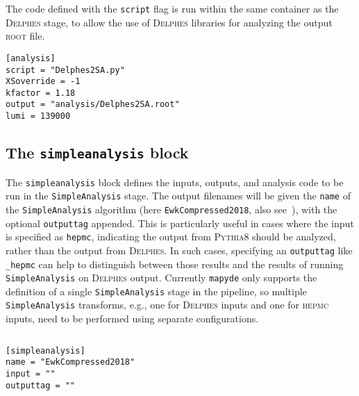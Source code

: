 \documentclass{article}
\newcommand{\mapyde}{\texttt{mapyde}}
\newcommand{\simpleanalysis}{\texttt{SimpleAnalysis}}
\newcommand{\pythia}{\textsc{Pythia8}}
\newcommand{\delphes}{\textsc{Delphes}}
\newcommand{\hepmc}{\textsc{hepmc}}
\newcommand{\ROOT}{\textsc{root}}
\newcommand{\toml}{\textsc{toml}}
\begin{document}
The code defined with the \texttt{script} flag is run within the same container as the \delphes{} stage, to allow the use of \delphes{} libraries for analyzing the output \ROOT{} file.

\begin{listing}[H]
	\begin{verbatim}
[analysis]
script = "Delphes2SA.py"
XSoverride = -1
kfactor = 1.18
output = "analysis/Delphes2SA.root"
lumi = 139000
        \end{verbatim}
	\caption{The \texttt{analysis} block of an example \toml{} configuration file for generating slepton events.}
	\label{slepton-config-analysis}
\end{listing}

\subsection{The \texttt{simpleanalysis} block}
\label{ssec:the-simpleanalysis-block}

The \texttt{simpleanalysis} block defines the inputs, outputs, and analysis code to be run in the \simpleanalysis{} stage.  The output filenames will be given the \texttt{name} of the \simpleanalysis{} algorithm (here \texttt{EwkCompressed2018}, also see~), with the optional \texttt{outputtag} appended.  This is particularly useful in cases where the input is specified as \texttt{hepmc}, indicating the output from \pythia{} should be analyzed, rather than the output from \delphes.  In such cases, specifying an \texttt{outputtag} like \texttt{\_hepmc} can help to distinguish between those results and the results of running \simpleanalysis{} on \delphes{} output.  Currently \mapyde{} only supports the definition of a single \simpleanalysis{} stage in the pipeline, so multiple \simpleanalysis{} transforms, e.g., one for \delphes{} inputs and one for \hepmc{} inputs, need to be performed using separate configurations.

\begin{listing}[H]
	\inputminted[firstline=1,lastline=3]{cpp}{auxdata/ANA-SUSY-2019-08.cxx}
	\caption{A snippet of \texttt{SimpleAnalysisCodes/src/ANA-SUSY-2019-08.cxx}~\cite{SAGitLab} showing how the analysis name is defined.}
	\label{lst:analysiscodenaming}
\end{listing}

\begin{listing}[H]
	\begin{verbatim}
[simpleanalysis]
name = "EwkCompressed2018"
input = ""
outputtag = ""
        \end{verbatim}
	\caption{The \texttt{simpleanalysis} block of an example \toml{} configuration file for generating slepton events.}
	\label{slepton-config-sa}
\end{listing}
\end{document}
